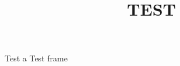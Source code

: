 \documentclass[xcolor={dvipsnames,svgnames,table},10pt]{beamer}
\title{TEST}
\begin{document}
\begin{frame}[plain]
    \titlepage
\end{frame}

\begin{frame}{Test}
 a Test frame
\end{frame}
\end{document}
